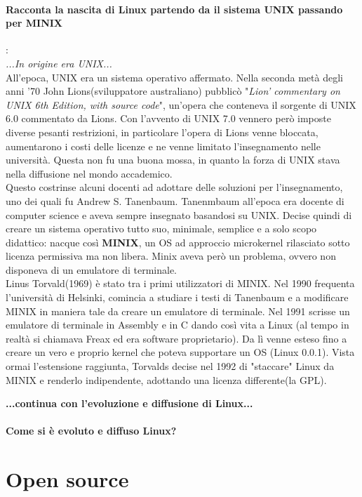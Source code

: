 \documentclass[a4paper]{article}
\begin{document}
		\paragraph{Racconta la nascita di Linux partendo da il sistema UNIX passando per MINIX}: \\
		\textit{...In origine era UNIX...}\\
		All'epoca, UNIX era un sistema operativo affermato. Nella seconda metà degli anni '70 John Lions(sviluppatore australiano) pubblicò "\textit{Lion' commentary on UNIX 6th Edition, with source code}", un'opera che conteneva il sorgente di UNIX 6.0 commentato da Lions. Con l'avvento di UNIX 7.0 vennero però imposte diverse pesanti restrizioni, in particolare l'opera di Lions venne bloccata, aumentarono i costi delle licenze e ne venne limitato l'insegnamento nelle università. Questa non fu una buona mossa, in quanto la forza di UNIX stava nella diffusione nel mondo accademico.\\
		Questo costrinse alcuni docenti ad adottare delle soluzioni per l'insegnamento, uno dei quali fu Andrew S. Tanenbaum.
		Tanenmbaum all'epoca era docente di computer science e aveva sempre insegnato basandosi su UNIX. Decise quindi di creare un sistema operativo tutto suo,  minimale, semplice e a solo scopo didattico: nacque così \textbf{MINIX}, un OS ad approccio microkernel rilasciato sotto licenza permissiva ma non libera.
		Minix aveva però un problema, ovvero non disponeva di un emulatore di terminale.\\
		Linus Torvald(1969) è stato tra i primi utilizzatori di MINIX. Nel 1990 frequenta l'università di Helsinki, comincia a studiare i testi di Tanenbaum e a modificare MINIX in maniera tale da creare un emulatore di terminale. Nel 1991 scrisse un emulatore di terminale in Assembly e in C dando così vita a Linux (al tempo in realtà si chiamava Freax ed era software proprietario). Da lì venne esteso fino a creare un vero e proprio kernel che poteva supportare un OS (Linux 0.0.1). Vista ormai l'estensione raggiunta, Torvalds decise nel 1992 di "staccare" Linux da MINIX e renderlo indipendente, adottando una licenza differente(la GPL).
		
		\textbf{...continua con l'evoluzione e diffusione di Linux...}
		
		
		\paragraph{Come si è evoluto e diffuso Linux?}		
	
	\section{Open source}	
\end{document}
